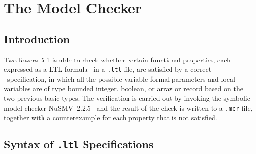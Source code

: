 \chapter{The Model Checker}


\section{Introduction}

TwoTowers~5.1 is able to check whether certain functional properties, each expressed as a LTL
formula~\cite{CGP} in a {\tt .ltl} file, are satisfied by a correct \aemilia\ specification, in which all
the possible variable formal parameters and local variables are of type bounded integer, boolean, or array
or record based on the two previous basic types. The verification is carried out by invoking the symbolic
model checker NuSMV~2.2.5~\cite{CCOPR} and the result of the check is written to a {\tt .mcr} file, together
with a counterexample for each property that is not satisfied.



\section{Syntax of {\tt .ltl} Specifications}

